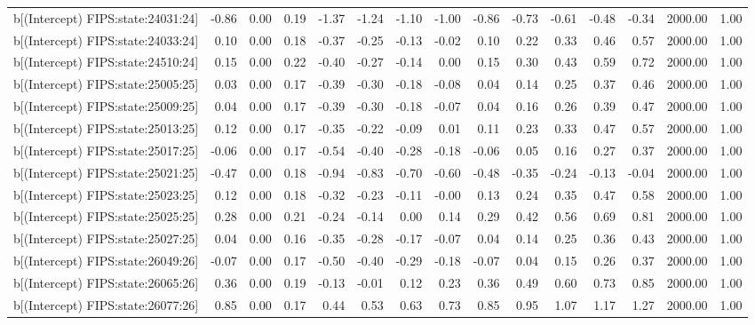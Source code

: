 \begin{table}[ht]
\begin{tabular}{rrrrrrrrrrrrrrr}
  b[(Intercept) FIPS:state:24031:24] & -0.86 & 0.00 & 0.19 & -1.37 & -1.24 & -1.10 & -1.00 & -0.86 & -0.73 & -0.61 & -0.48 & -0.34 & 2000.00 & 1.00 \\ 
  b[(Intercept) FIPS:state:24033:24] & 0.10 & 0.00 & 0.18 & -0.37 & -0.25 & -0.13 & -0.02 & 0.10 & 0.22 & 0.33 & 0.46 & 0.57 & 2000.00 & 1.00 \\ 
  b[(Intercept) FIPS:state:24510:24] & 0.15 & 0.00 & 0.22 & -0.40 & -0.27 & -0.14 & 0.00 & 0.15 & 0.30 & 0.43 & 0.59 & 0.72 & 2000.00 & 1.00 \\ 
  b[(Intercept) FIPS:state:25005:25] & 0.03 & 0.00 & 0.17 & -0.39 & -0.30 & -0.18 & -0.08 & 0.04 & 0.14 & 0.25 & 0.37 & 0.46 & 2000.00 & 1.00 \\ 
  b[(Intercept) FIPS:state:25009:25] & 0.04 & 0.00 & 0.17 & -0.39 & -0.30 & -0.18 & -0.07 & 0.04 & 0.16 & 0.26 & 0.39 & 0.47 & 2000.00 & 1.00 \\ 
  b[(Intercept) FIPS:state:25013:25] & 0.12 & 0.00 & 0.17 & -0.35 & -0.22 & -0.09 & 0.01 & 0.11 & 0.23 & 0.33 & 0.47 & 0.57 & 2000.00 & 1.00 \\ 
  b[(Intercept) FIPS:state:25017:25] & -0.06 & 0.00 & 0.17 & -0.54 & -0.40 & -0.28 & -0.18 & -0.06 & 0.05 & 0.16 & 0.27 & 0.37 & 2000.00 & 1.00 \\ 
  b[(Intercept) FIPS:state:25021:25] & -0.47 & 0.00 & 0.18 & -0.94 & -0.83 & -0.70 & -0.60 & -0.48 & -0.35 & -0.24 & -0.13 & -0.04 & 2000.00 & 1.00 \\ 
  b[(Intercept) FIPS:state:25023:25] & 0.12 & 0.00 & 0.18 & -0.32 & -0.23 & -0.11 & -0.00 & 0.13 & 0.24 & 0.35 & 0.47 & 0.58 & 2000.00 & 1.00 \\ 
  b[(Intercept) FIPS:state:25025:25] & 0.28 & 0.00 & 0.21 & -0.24 & -0.14 & 0.00 & 0.14 & 0.29 & 0.42 & 0.56 & 0.69 & 0.81 & 2000.00 & 1.00 \\ 
  b[(Intercept) FIPS:state:25027:25] & 0.04 & 0.00 & 0.16 & -0.35 & -0.28 & -0.17 & -0.07 & 0.04 & 0.14 & 0.25 & 0.36 & 0.43 & 2000.00 & 1.00 \\ 
  b[(Intercept) FIPS:state:26049:26] & -0.07 & 0.00 & 0.17 & -0.50 & -0.40 & -0.29 & -0.18 & -0.07 & 0.04 & 0.15 & 0.26 & 0.37 & 2000.00 & 1.00 \\ 
  b[(Intercept) FIPS:state:26065:26] & 0.36 & 0.00 & 0.19 & -0.13 & -0.01 & 0.12 & 0.23 & 0.36 & 0.49 & 0.60 & 0.73 & 0.85 & 2000.00 & 1.00 \\ 
  b[(Intercept) FIPS:state:26077:26] & 0.85 & 0.00 & 0.17 & 0.44 & 0.53 & 0.63 & 0.73 & 0.85 & 0.95 & 1.07 & 1.17 & 1.27 & 2000.00 & 1.00 \\ 

\end{tabular}
\end{table}
